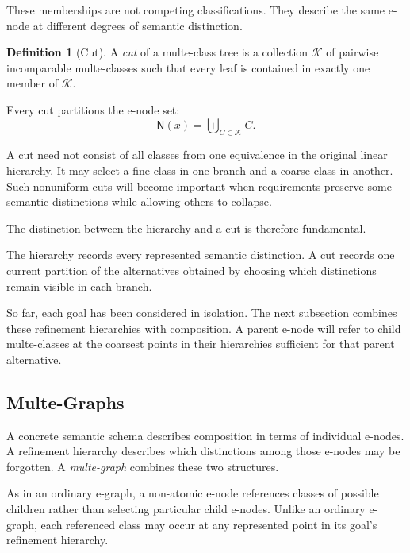 \documentclass[sigconf,nonacm]{acmart}
\theoremstyle{definition}
\newtheorem{definition}{Definition}[section]
\theoremstyle{plain}
\theoremstyle{remark}
\begin{document}
These memberships are not competing classifications.  They describe
the same e-node at different degrees of semantic distinction.

\begin{definition}[Cut]
A \emph{cut} of a multe-class tree is a collection \(\mathcal{K}\)
of pairwise incomparable multe-classes such that every leaf is
contained in exactly one member of \(\mathcal{K}\).
\end{definition}

Every cut partitions the e-node set:
\[
\mathsf{N}(x)
=
\biguplus_{C\in\mathcal{K}} C.
\]

A cut need not consist of all classes from one equivalence in the
original linear hierarchy.  It may select a fine class in one branch
and a coarse class in another.  Such nonuniform cuts will become
important when requirements preserve some semantic distinctions while
allowing others to collapse.

The distinction between the hierarchy and a cut is therefore
fundamental.

The hierarchy records every represented semantic distinction.
A cut records one current partition of the alternatives obtained by
choosing which distinctions remain visible in each branch.

So far, each goal has been considered in isolation.
The next subsection combines these refinement hierarchies with
composition.  A parent e-node will refer to child multe-classes at the
coarsest points in their hierarchies sufficient for that parent
alternative.

\subsection{Multe-Graphs}
\label{sec:multe-graphs}

A concrete semantic schema describes composition in terms of
individual e-nodes.  A refinement hierarchy describes which
distinctions among those e-nodes may be forgotten.  A
\emph{multe-graph} combines these two structures.

As in an ordinary e-graph, a non-atomic e-node references classes of
possible children rather than selecting particular child e-nodes.
Unlike an ordinary e-graph, each referenced class may occur at any
represented point in its goal's refinement hierarchy.

\end{document}
